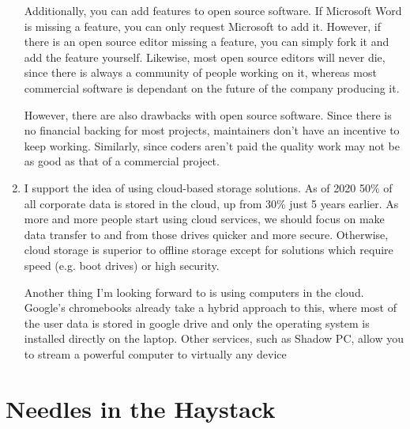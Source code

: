 \documentclass{scrartcl}
\begin{document}
\begin{enumerate}
Additionally, you can add features to open source software. If Microsoft Word is
missing a feature, you can only request Microsoft to add it. However, if
there is an open source editor missing a feature, you can simply fork it and
add the feature yourself. Likewise, most open source editors will never die,
since there is always a community of people working on it, whereas most
commercial software is dependant on the future of the company producing it.

However, there are also drawbacks with open source software. Since there is
no financial backing for most projects, maintainers don't have an incentive
to keep working. Similarly, since coders aren't paid the quality work may not
be as good as that of a commercial project.

\item I support the idea of using cloud-based storage solutions. As of 2020 50\% of all
corporate data is stored in the cloud, up from 30\% just 5 years earlier. As
more and more people start using cloud services,  we should focus on make
data transfer to and from those drives quicker and more secure. Otherwise,
cloud storage is superior to offline storage except for solutions which
require speed (e.g. boot drives) or high security.

Another thing I'm looking forward to is using computers in the cloud.
Google's chromebooks already take a hybrid approach to this, where most of
the user data is stored in google drive and only the operating system is
installed directly on the laptop. Other services, such as Shadow PC, allow
you to stream a powerful computer to virtually any device
\end{enumerate}

\section{Needles in the Haystack}
\label{sec:org2bb750a}
\end{document}
